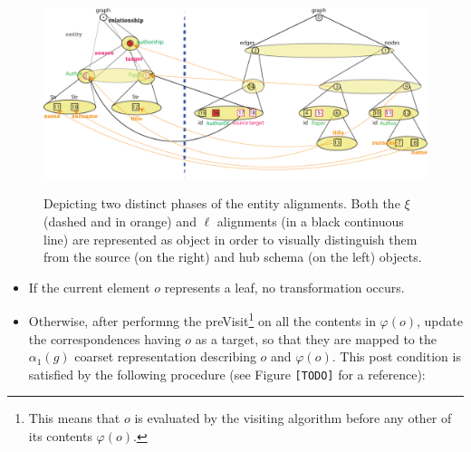 \begin{example}[continues=ex:examplegraphdata,label=ex:examplereferencedOcaml]
\begin{figure}[!t]
	\begin{minipage}{\textwidth}
		\centering
		\includegraphics[width=\textwidth]{fig/04model/04bAlignment}
		\label{subfig:match2}
	\end{minipage}
	\caption{Depicting two distinct phases of the entity alignments. Both the $\xi$  (dashed and in orange) and  $\ell$ alignments (in a black continuous line) are represented as object in order to visually distinguish them from the source (on the right) and hub  schema (on the left) objects.}
	\label{fig:alignmentrefinement}
\end{figure}
\begin{itemize}
	\item If the current element $o$ represents a leaf, no transformation occurs.
	\item Otherwise, after performng the preVisit\footnote{This means that $o$ is evaluated by the visiting algorithm before any other of its contents $\varphi(o)$.} on all the contents in $\varphi(o)$, update the  correspondences having $o$ as  a target, so that they are mapped to the $\alpha_1(g)$ coarset representation describing $o$ and $\varphi(o)$. This post condition is satisfied by the following procedure (see Figure \texttt{[TODO]} for a reference):
	\medskip
	

\end{itemize}
\end{example}
